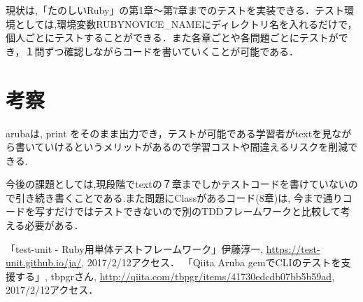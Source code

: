 \documentclass[10pt,a4j,twocolumn]{jsarticle}
\begin{document}
現状は,「たのしいRuby」の第1章〜第7章までのテストを実装できる．テスト環境としては,環境変数RUBYNOVICE\_NAMEにディレクトリ名を入れるだけで，個人ごとにテストすることができる．また各章ごとや各問題ごとにテストができ，１問ずつ確認しながらコードを書いていくことが可能である．

\section{考察}
arubaは, print をそのまま出力でき，テストが可能である学習者がtextを見ながら書いていけるというメリットがあるので学習コストや間違えるリスクを削減できる.

今後の課題としては,現段階でtextの７章までしかテストコードを書けていないので引き続き書くことである.また問題にClassがあるコード(8章)は, 今まで通りコードを写すだけではテストできないので別のTDDフレームワークと比較して考える必要がある．


\begin{flushleft}
\begin{thebibliography}{9}

「test-unit - Ruby用単体テストフレームワーク」伊藤淳一, \url{https://test-unit.github.io/ja/}, 2017/2/12アクセス．
「Qiita Aruba gemでCLIのテストを支援する」, tbpgrさん, \url{http://qiita.com/tbpgr/items/41730edcdb07bb5b59ad}, 2017/2/12アクセス．

\end{thebibliography}
\end{flushleft}
\end{document}
